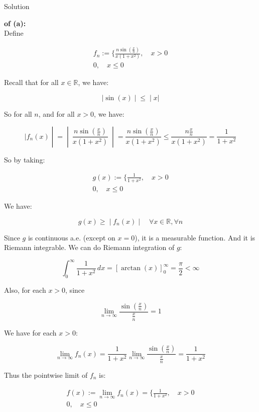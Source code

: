 \begin{qlsolution}{Solution}

\textbf{of (a):}\\
Define

\[\begin{matrix}
{f_{n} := \{\frac{n\sin\left( \frac{x}{n} \right)}{x(1 + x^{2})},\quad x > 0} \\
{0,\quad x \leq 0}
\end{matrix}\]

Recall that for all \(x \in \mathbb{R}\), we have:

\[\left. |\sin(x) \middle| \leq \middle| x| \right.\]

So for all \(n\), and for all \(x > 0\), we have:

\[\left. |f_{n}(x) \middle| = \middle| \ \frac{n\sin\left( \frac{x}{n} \right)}{x(1 + x^{2})}\  \middle| = \frac{n\sin\left( \frac{x}{n} \right)}{x(1 + x^{2})} \leq \frac{n\frac{x}{n}}{x(1 + x^{2})} = \frac{1}{1 + x^{2}} \right.\]

So by taking:

\[\begin{matrix}
{g(x) := \{\frac{1}{1 + x^{2}},\quad x > 0} \\
{0,\quad x \leq 0}
\end{matrix}\]

We have:

\[\left. g(x) \geq \middle| f_{n}(x) \middle| \quad\forall x \in \mathbb{R},\forall n \right.\]

Since \(g\) is continuous a.e. (except on \(x = 0\)), it is a measurable function. And it is Riemann integrable. We can do Riemann integration of \(g\):

\[\int_{0}^{\infty}\frac{1}{1 + x^{2}}\, dx = \left\lbrack {\arctan(x)} \right\rbrack_{0}^{\infty} = \frac{\pi}{2} < \infty\]

Also, for each \(x > 0\), since

\[\lim\limits_{n\rightarrow\infty}\frac{\sin(\frac{x}{n})}{\frac{x}{n}} = 1\]

We have for each \(x > 0\):

\[\lim\limits_{n\rightarrow\infty}f_{n}(x) = \frac{1}{1 + x^{2}}\lim\limits_{n\rightarrow\infty}\frac{\sin(\frac{x}{n})}{\frac{x}{n}} = \frac{1}{1 + x^{2}}\]

Thus the pointwise limit of \(f_{n}\) is:

\[\begin{matrix}
{f(x) := \lim\limits_{n\rightarrow\infty}f_{n}(x) = \{\frac{1}{1 + x^{2}},\quad x > 0} \\
{0,\quad x \leq 0}
\end{matrix}\]


\end{qlsolution}
